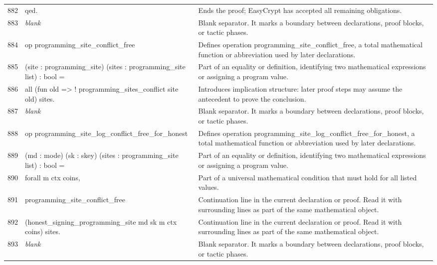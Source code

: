 \documentclass[10pt]{article}
\begin{document}
\begin{longtable}{r L{0.53\textwidth} L{0.37\textwidth}}
882 & {\ttfamily\scriptsize qed.} & Ends the proof; EasyCrypt has accepted all remaining obligations. \\
883 & {\ttfamily\scriptsize \emph{blank}} & Blank separator.  It marks a boundary between declarations, proof blocks, or tactic phases. \\
884 & {\ttfamily\scriptsize op programming\_site\_conflict\_free} & Defines operation programming\_site\_conflict\_free, a total mathematical function or abbreviation used by later declarations. \\
885 & {\ttfamily\scriptsize    (site : programming\_site) (sites : programming\_site list) : bool =} & Part of an equality or definition, identifying two mathematical expressions or assigning a program value. \\
886 & {\ttfamily\scriptsize   all (fun old => ! programming\_sites\_conflict site old) sites.} & Introduces implication structure: later proof steps may assume the antecedent to prove the conclusion. \\
887 & {\ttfamily\scriptsize \emph{blank}} & Blank separator.  It marks a boundary between declarations, proof blocks, or tactic phases. \\
888 & {\ttfamily\scriptsize op programming\_site\_log\_conflict\_free\_for\_honest} & Defines operation programming\_site\_log\_conflict\_free\_for\_honest, a total mathematical function or abbreviation used by later declarations. \\
889 & {\ttfamily\scriptsize    (md : mode) (sk : skey) (sites : programming\_site list) : bool =} & Part of an equality or definition, identifying two mathematical expressions or assigning a program value. \\
890 & {\ttfamily\scriptsize   forall m ctx coins,} & Part of a universal mathematical condition that must hold for all listed values. \\
891 & {\ttfamily\scriptsize     programming\_site\_conflict\_free} & Continuation line in the current declaration or proof.  Read it with surrounding lines as part of the same mathematical object. \\
892 & {\ttfamily\scriptsize       (honest\_signing\_programming\_site md sk m ctx coins) sites.} & Continuation line in the current declaration or proof.  Read it with surrounding lines as part of the same mathematical object. \\
893 & {\ttfamily\scriptsize \emph{blank}} & Blank separator.  It marks a boundary between declarations, proof blocks, or tactic phases. \\

\end{longtable}
\end{document}
